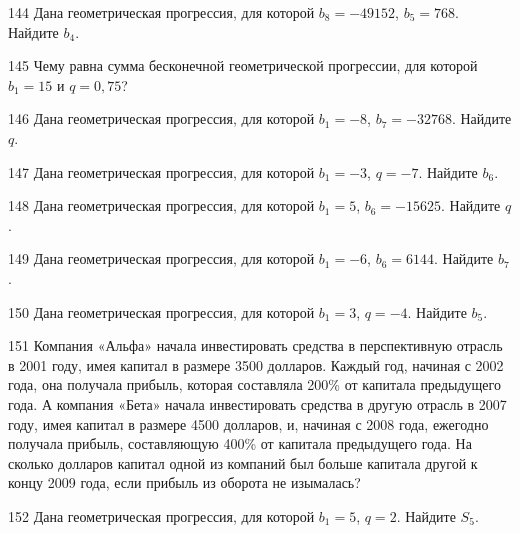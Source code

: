 \documentclass[4apaper]{article}
\begin{document}
\begin{taskBN}{144}
Дана геометрическая прогрессия, для которой $b_{8} = -49152$, $b_{5}=768$. Найдите $b_{4}$.
\end{taskBN}

\begin{taskBN}{145}
Чему равна сумма бесконечной геометрической прогрессии, для которой $b_1 = 15$ и $q=0,75$?
\end{taskBN}

\begin{taskBN}{146}
Дана геометрическая прогрессия, для которой $b_1 = -8$, $b_{7}=-32768$. Найдите $q$.
\end{taskBN}

\begin{taskBN}{147}
Дана геометрическая прогрессия, для которой $b_1 = -3$, $q=-7$. Найдите $b_{6}$.
\end{taskBN}

\begin{taskBN}{148}
Дана геометрическая прогрессия, для которой $b_1 = 5$, $b_{6}=-15625$. Найдите $q$.
\end{taskBN}

\begin{taskBN}{149}
Дана геометрическая прогрессия, для которой $b_1 = -6$, $b_{6}=6144$. Найдите $b_{7}$.
\end{taskBN}

\begin{taskBN}{150}
Дана геометрическая прогрессия, для которой $b_1 = 3$, $q=-4$. Найдите $b_{5}$.
\end{taskBN}

\begin{taskBN}{151}
Компания «Альфа» начала инвестировать средства в перспективную отрасль в 2001 году, имея капитал в размере 3500 долларов. Каждый год, начиная с 2002 года, она получала прибыль, которая составляла 200\% от капитала предыдущего года. А компания «Бета» начала инвестировать средства в другую отрасль в 2007 году, имея капитал в размере 4500 долларов, и, начиная с 2008 года, ежегодно получала прибыль, составляющую 400\% от капитала предыдущего года. На сколько долларов капитал одной из компаний был больше капитала другой к концу 2009 года, если прибыль из оборота не изымалась?
\end{taskBN}

\begin{taskBN}{152}
Дана геометрическая прогрессия, для которой $b_1 = 5$, $q=2$. Найдите $S_{5}$.
\end{taskBN}
\end{document}
